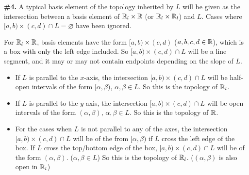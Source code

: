 \documentclass[a4paper,11pt]{article}
\begin{document}
\begin{minipage}[t][270mm]{90mm}
    {\bfseries \large \#4.} A typical basis element of the topology inherited by \(L\) will be given as the intersection between a basis element of \(\mathbb{R}_l \times \mathbb{R}\) (or \(\mathbb{R}_l \times \mathbb{R}_l\)) and \(L\). Cases where \([a, b) \times (c, d) \cap L = \varnothing\) have been ignored.

    \bigskip

    For \(\mathbb{R}_l \times \mathbb{R}\), basis elements have the form \([a, b) \times (c, d)\) (\(a, b, c, d \in \mathbb{R}\)), which is a box with only the left edge included. So \([a, b) \times (c, d) \cap L\) will be a line segment, and it may or may not contain endpoints depending on the slope of \(L\).
    \begin{itemize}
        \item If \(L\) is parallel to the \(x\)-axis, the intersection \([a, b) \times (c, d) \cap L\) will be half-open intervals of the form \([\alpha, \beta)\), \(\alpha, \beta \in L\). So this is the topology of \(\mathbb{R}_l\).
        \item If \(L\) is parallel to the \(y\)-axis, the intersection \([a, b) \times (c, d) \cap L\) will be open intervals of the form \((\alpha, \beta)\), \(\alpha, \beta \in L\). So this is the topology of \(\mathbb{R}\).
        \item For the cases when \(L\) is not parallel to any of the axes, the intersection \([a, b) \times (c, d) \cap L\) will be of the from \([\alpha, \beta)\) if \(L\) cross the left edge of the box. If \(L\) cross the top/bottom edge of the box, \([a, b) \times (c, d) \cap L\) will be of the form \((\alpha, \beta)\). (\(\alpha, \beta \in L\)) So this is the topology of \(\mathbb{R}_l\). (\((\alpha, \beta)\) is also open in \(\mathbb{R}_l\))
    \end{itemize}


\end{minipage}
\end{document}
